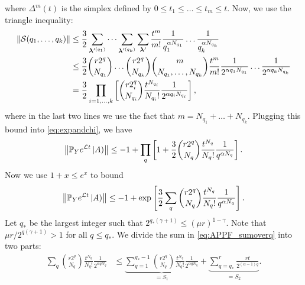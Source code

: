 where $\Delta^m(t)$ is the simplex defined by $0\leq t_1\leq\dots \leq t_m\leq t$.
Now, we use the triangle inequality:
\begin{align}
\left\|\mathcal S(q_1,\dots,q_k)\right\|&\leq
\frac{3}{2}  \sum_{\bm \lambda'^{(q_1)}} \dots\sum_{\bm \lambda'^{(q_k)}}
\sum_{\bm\lambda'}
\frac{t^m}{m!}
\frac{1}{q_1^{\alpha N_{q_1}}} \dots \frac{1}{q_k^{\alpha N_{q_k}}}\\
&\leq\frac{3}{2}  \binom{r2^q}{N_{q_1}}\dots\binom{r2^q}{N_{q_k}}
\binom{m}{N_{q_1},\dots,N_{q_k}}
\frac{t^m}{m!}
\frac{1}{2^{\alpha q_1 N_{q_1}}} \dots \frac{1}{2^{\alpha q_k N_{q_k}}}\\
&=\frac{3}{2} \prod_{i=1,\dots,k} \left[\binom{r2^q_i}{N_{q_i}}\frac{t^{N_{q_i}}}{N_{q_i}!}
\frac{1}{2^{\alpha q_i N_{q_i}}}\right],
\end{align}
where in the last two lines we use the fact that $m = N_{q_1}+\dots+N_{q_k}$.
Plugging this bound into \cref{eq:expandchi}, we have
\begin{align}
	\left\|\mathbb{P}_Y e^{\mathcal{L} t}\left | A \right)\right\| \leq -1 + \prod_{q} \left[1+\frac{3}{2}\binom{r 2^q}{N_{q}}\frac{t^{N_{q}}}{N_{q}!}
\frac{1}{q^{\alpha N_{q}}}\right].
\end{align}
Now we use $1+x \leq e^x$ to bound
\begin{align}
	\left\|\mathbb{P}_Y e^{\mathcal{L} t}\left | A \right)\right\| \leq -1 + \exp\left[\frac{3}{2}\sum_{q} \binom{r 2^q}{N_{q}}\frac{t^{N_{q}}}{N_{q}!}
	\frac{1}{q^{\alpha N_{q}}}\right].\label{eq:APPF_sumoverq}
\end{align}
Let $q_*$ be the largest integer such that $2^{q_*(\gamma+1)}\leq (\mu r)^{1-\gamma}$.
Note that $\mu r/2^{q(\gamma+1)}>1$ for all $q\leq q_*$.
We divide the sum in \cref{eq:APPF_sumoverq} into two parts:
\begin{align}
	\sum_{q} \binom{r2^q}{N_{q}}\frac{t^{N_{q}}}{N_{q}!}
	\frac{1}{2^{\alpha q N_{q}}}
	&
	\leq \underbrace{\sum_{q=1}^{q_*-1} \binom{r2^q}{N_{q}}\frac{t^{N_{q}}}{N_{q}!}
	\frac{1}{2^{\alpha q N_{q}}}}_{=S_1}
	+\underbrace{\sum_{q=q_*}^{r}\frac{rt}{2^{(\alpha-1) q}}}_{=S_2}.\label{eq:twosum}
\end{align}
